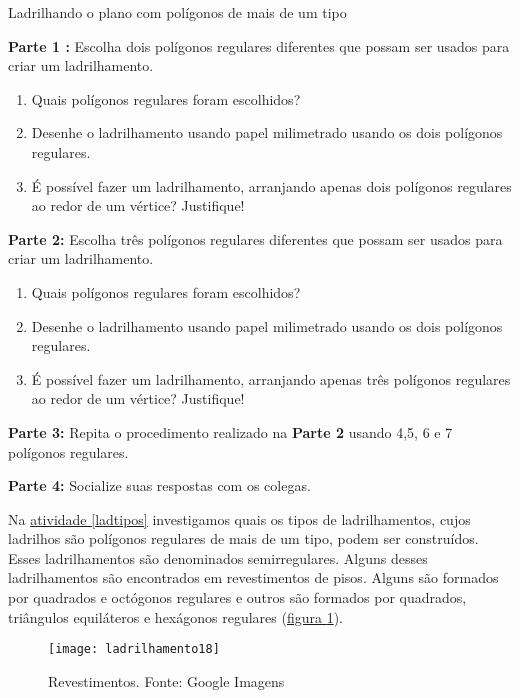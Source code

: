 \begin{task}{Ladrilhando o plano com polígonos de mais de um tipo}\label{ladtipos}

\textbf{Parte 1 :} Escolha dois polígonos regulares diferentes que possam ser usados para criar um ladrilhamento. 
\begin{enumerate}
\item Quais polígonos regulares foram escolhidos?
\item Desenhe o ladrilhamento usando papel milimetrado usando os dois polígonos regulares. 
\item É possível fazer um ladrilhamento, arranjando  apenas dois polígonos regulares ao redor de um vértice? Justifique! 
\end{enumerate}

\textbf{Parte 2:} Escolha três polígonos regulares diferentes que possam ser usados para criar um ladrilhamento. 
\begin{enumerate}
\item Quais polígonos regulares foram escolhidos?
\item Desenhe o ladrilhamento usando papel milimetrado usando os dois polígonos regulares. 
\item É possível fazer um ladrilhamento, arranjando  apenas três polígonos regulares ao redor de um vértice? Justifique! 
\end{enumerate}


\textbf{Parte 3:} Repita o procedimento realizado na \textbf{Parte 2 }usando 4,5, 6 e 7 polígonos regulares.

\textbf{Parte 4:} Socialize suas respostas com os colegas.

\end{task}



Na \hyperref[ladtipos]{atividade \ref{ladtipos}} investigamos  quais os tipos de ladrilhamentos, cujos ladrilhos são polígonos regulares de mais de um tipo, podem ser construídos. Esses ladrilhamentos são denominados semirregulares. Alguns desses ladrilhamentos são encontrados em revestimentos de pisos. Alguns são formados por quadrados e octógonos regulares  e outros são formados por quadrados, triângulos equiláteros e hexágonos regulares (\hyperref[lad_tp1]{figura \ref{lad_tp1}}).


\begin{figure}[H]
\centering
\texttt{[image: ladrilhamento18]}
\caption{Revestimentos. Fonte: Google Imagens}
\label{lad_tp1}
\end{figure}

